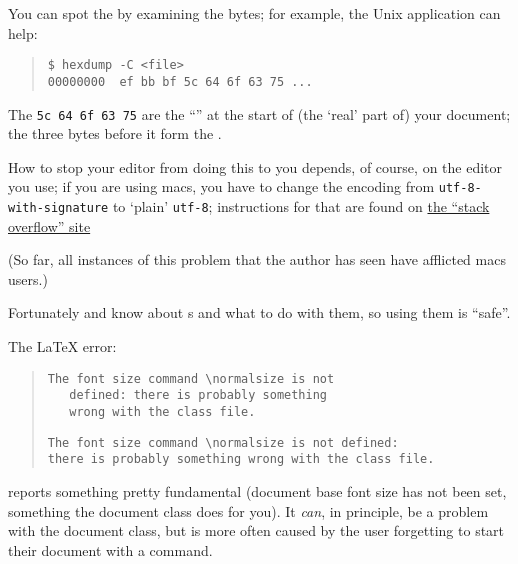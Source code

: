 {You can spot the  by examining the bytes; for example, the
Unix  application can help:
\begin{quote}
\begin{verbatim}
$ hexdump -C <file>
00000000  ef bb bf 5c 64 6f 63 75 ...
\end{verbatim}
\end{quote}
The \texttt{5c 64 6f 63 75} are the ``'' at the start of
(the `real' part of) your document; the three bytes before it form the
.

How to stop your editor from doing this to you depends, of course, on
the editor you use; if you are using macs, you have to
change the encoding from \texttt{utf-8-with-signature} to `plain'
\texttt{utf-8}; instructions for that are found on
\href{http://stackoverflow.com/questions/3859274/}{the ``stack overflow'' site}

(So far, all instances of this problem that the author has seen have
afflicted macs users.)

Fortunately \xetex{} and \luatex{} know about s and what to
do with them, so \latex{} using them is ``safe''.


The \LaTeX{} error:
\begin{quote}
\begin{narrowversion}
\begin{verbatim}
The font size command \normalsize is not
   defined: there is probably something
   wrong with the class file.
\end{verbatim}
\end{narrowversion}
\begin{wideversion}
\begin{verbatim}
The font size command \normalsize is not defined:
there is probably something wrong with the class file.
\end{verbatim}
\end{wideversion}
\end{quote}
reports something pretty fundamental (document base font size has not
been set, something the document class does for you).  It \emph{can},
in principle, be a problem with the document class, but is more often
caused by the user forgetting to start their document with a
 command.


}
